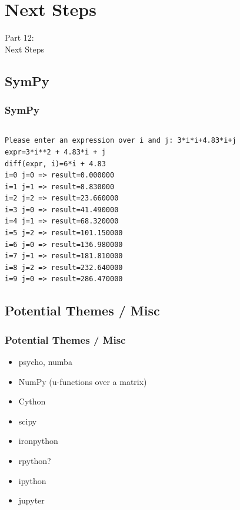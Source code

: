 
\section{Next Steps}
\begin{frame}
    \vspace{25mm}
    \begin{center}
        \Huge{Part 12:\\Next Steps}
    \end{center}
\end{frame}

\subsection{SymPy}
\begin{frame}[fragile]
    \frametitle{SymPy}
    \vspace{2mm}
    \inputminted[fontsize=\tiny]{python}{../src/sympyexample.py}
    \pause
    \vspace{5mm}
    
    {\tiny
    \begin{verbatim}
Please enter an expression over i and j: 3*i*i+4.83*i+j 
expr=3*i**2 + 4.83*i + j
diff(expr, i)=6*i + 4.83
i=0 j=0 => result=0.000000
i=1 j=1 => result=8.830000
i=2 j=2 => result=23.660000
i=3 j=0 => result=41.490000
i=4 j=1 => result=68.320000
i=5 j=2 => result=101.150000
i=6 j=0 => result=136.980000
i=7 j=1 => result=181.810000
i=8 j=2 => result=232.640000
i=9 j=0 => result=286.470000
    \end{verbatim}
    }
\end{frame}

\subsection{Potential Themes / Misc}
\begin{frame}
    \frametitle{Potential Themes / Misc}
    \vspace{5mm}
    
    \begin{itemize}
      \item psycho, numba
      \item NumPy (u-functions over a matrix)
      \item Cython
      \item scipy
      \item ironpython
      \item rpython?
      \item ipython
      \item jupyter
    \end{itemize}
\end{frame}

